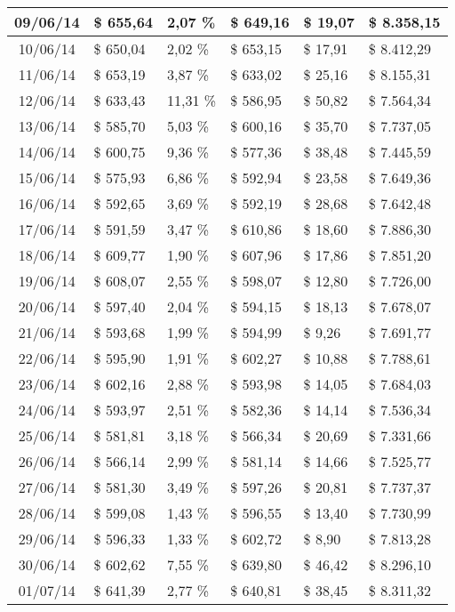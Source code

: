 \begin{small}
\begin{longtable}{|c|l|l|l|l|l|}
09/06/14 & \$ 655,64 & 2,07 \% & \$ 649,16 & \$ 19,07 & \$ 8.358,15 \\ \hline
10/06/14 & \$ 650,04 & 2,02 \% & \$ 653,15 & \$ 17,91 & \$ 8.412,29 \\ \hline
11/06/14 & \$ 653,19 & 3,87 \% & \$ 633,02 & \$ 25,16 & \$ 8.155,31 \\ \hline
12/06/14 & \$ 633,43 & 11,31 \% & \$ 586,95 & \$ 50,82 & \$ 7.564,34 \\ \hline
13/06/14 & \$ 585,70 & 5,03 \% & \$ 600,16 & \$ 35,70 & \$ 7.737,05 \\ \hline
14/06/14 & \$ 600,75 & 9,36 \% & \$ 577,36 & \$ 38,48 & \$ 7.445,59 \\ \hline
15/06/14 & \$ 575,93 & 6,86 \% & \$ 592,94 & \$ 23,58 & \$ 7.649,36 \\ \hline
16/06/14 & \$ 592,65 & 3,69 \% & \$ 592,19 & \$ 28,68 & \$ 7.642,48 \\ \hline
17/06/14 & \$ 591,59 & 3,47 \% & \$ 610,86 & \$ 18,60 & \$ 7.886,30 \\ \hline
18/06/14 & \$ 609,77 & 1,90 \% & \$ 607,96 & \$ 17,86 & \$ 7.851,20 \\ \hline
19/06/14 & \$ 608,07 & 2,55 \% & \$ 598,07 & \$ 12,80 & \$ 7.726,00 \\ \hline
20/06/14 & \$ 597,40 & 2,04 \% & \$ 594,15 & \$ 18,13 & \$ 7.678,07 \\ \hline
21/06/14 & \$ 593,68 & 1,99 \% & \$ 594,99 & \$ 9,26 & \$ 7.691,77 \\ \hline
22/06/14 & \$ 595,90 & 1,91 \% & \$ 602,27 & \$ 10,88 & \$ 7.788,61 \\ \hline
23/06/14 & \$ 602,16 & 2,88 \% & \$ 593,98 & \$ 14,05 & \$ 7.684,03 \\ \hline
24/06/14 & \$ 593,97 & 2,51 \% & \$ 582,36 & \$ 14,14 & \$ 7.536,34 \\ \hline
25/06/14 & \$ 581,81 & 3,18 \% & \$ 566,34 & \$ 20,69 & \$ 7.331,66 \\ \hline
26/06/14 & \$ 566,14 & 2,99 \% & \$ 581,14 & \$ 14,66 & \$ 7.525,77 \\ \hline
27/06/14 & \$ 581,30 & 3,49 \% & \$ 597,26 & \$ 20,81 & \$ 7.737,37 \\ \hline
28/06/14 & \$ 599,08 & 1,43 \% & \$ 596,55 & \$ 13,40 & \$ 7.730,99 \\ \hline
29/06/14 & \$ 596,33 & 1,33 \% & \$ 602,72 & \$ 8,90 & \$ 7.813,28 \\ \hline
30/06/14 & \$ 602,62 & 7,55 \% & \$ 639,80 & \$ 46,42 & \$ 8.296,10 \\ \hline
01/07/14 & \$ 641,39 & 2,77 \% & \$ 640,81 & \$ 38,45 & \$ 8.311,32 \\ \hline

\end{longtable}
\end{small}
